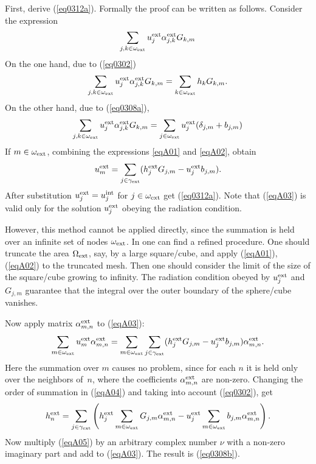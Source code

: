 \documentclass[12pt]{article}
\newcommand{\rin}{{\rm int}}
\newcommand{\rex}{{\rm ext}}
\begin{document}
First, derive (\ref{eq0312a}). Formally the proof can be written as follows.
Consider the expression
\[
\sum_{j,k \in \omega_\rex} u_j^\rex \alpha_{j,k}^\rex G_{k,m}
\]
On the one hand, due to (\ref{eq0302})
\begin{equation}
\sum_{j,k \in \omega_\rex} u_j^\rex \alpha_{j,k}^\rex G_{k,m} = \sum_{k \in \omega_\rex} h_k G_{k, m}.
\label{eqA01}
\end{equation}
On the other hand, due to (\ref{eq0308a}),
\begin{equation}
\sum_{j,k \in \omega_\rex} u_j^\rex \alpha_{j,k}^\rex G_{k,m} =
\sum_{j \in \omega_\rex} u_j^{\rex} (\delta_{j, m} + b_{j, m})
\label{eqA02}
\end{equation}
If $m \in \omega_\rex$, combining the expressions \ref{eqA01} and \ref{eqA02}, obtain
\begin{equation}
u_m^\rex = \sum_{j \in \gamma_\rex} (h_j^\rex G_{j,m} - u_j^\rex b_{j,m}).
\label{eqA03}
\end{equation}
After substitution  $u^\rex_j = u^\rin_j$ for $j \in \omega_\rex$ get (\ref{eq0312a}). Note that
(\ref{eqA03}) is valid only for the solution $u^\rex_j$ obeying the radiation condition.

However, this method cannot be applied directly, since the
summation is held over an infinite set of nodes $\omega_\rex$. In \cite{poblet-PVS:2014} one can find a refined procedure.
One should truncate the area $\Omega_\rex$, say, by a large square/cube, and apply (\ref{eqA01}), (\ref{eqA02}) to the truncated mesh. Then one should consider the limit of the size of the square/cube growing to infinity. The radiation condition obeyed by $u_j^\rex$ and $G_{j,m}$ guarantee that the integral over the outer boundary of the
sphere/cube vanishes.

Now apply matrix $\alpha^\rex_{m,n}$ to (\ref{eqA03}):
\begin{equation}
\sum_{m \in \omega_\rex} u_m^\rex \alpha^\rex_{m,n} =
\sum_{m \in \omega_\rex}\sum_{j \in \gamma_\rex} (h_j^\rex G_{j,m} - u_j^\rex b_{j,m}) \alpha^\rex_{m,n}.
\label{eqA04}
\end{equation}
Here the summation over $m$ causes no problem, since for each $n$ it is held only over the neighbors of~$n$,
where the coefficients $\alpha^\rex_{m,n}$ are non-zero.
Changing the order of summation in (\ref{eqA04}) and taking into account (\ref{eq0302}), get
\begin{equation}
h^\rex_n =
\sum_{j \in \gamma_\rex} \left( h_j^\rex \sum_{m \in \omega_\rex}G_{j,m} \alpha^\rex_{m,n} -
u_j^\rex \sum_{m \in \omega_\rex} b_{j,m} \alpha^\rex_{m,n} \right) .
\label{eqA05}
\end{equation}
Now multiply (\ref{eqA05}) by an arbitrary complex number $\nu$ with a non-zero imaginary part and add to
(\ref{eqA03}). The result is (\ref{eq0308b}).
\end{document}
